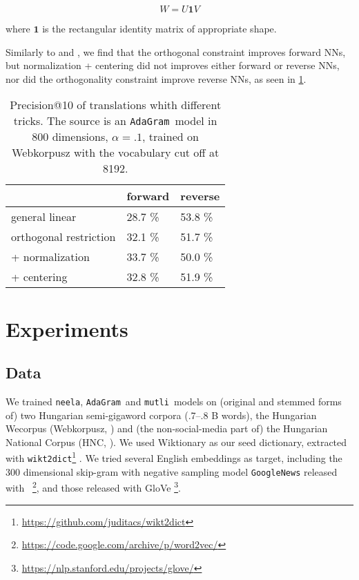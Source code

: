 \documentclass[11pt]{article}
\newcommand{\neelakantan}{\texttt{neela}}
\newcommand{\adagram}{\texttt{AdaGram}}
\newcommand{\mutli}{\texttt{mutli}}
\begin{document}
\[W=U\mathbf{1}V\]
 
\noindent where $\mathbf 1$ is the rectangular identity matrix of appropriate
shape.

Similarly to \cite{Xing:2015} and \cite{Artetxe:2016}, we find that the
orthogonal constraint improves forward NNs, but normalization + centering did
not improves either forward or reverse NNs, nor did the orthogonality
constraint improve reverse NNs, as seen in \cref{tab:orthog}.

\begin{table}
  \centering
  \begin{tabular}{lll}
    \toprule
                          & forward & reverse \\
    \midrule
    general linear        & 28.7 \% & 53.8 \% \\
    orthogonal restriction& 32.1 \% & 51.7 \% \\
    + normalization       & 33.7 \% & 50.0 \% \\
    + centering           & 32.8 \% & 51.9 \% \\
    \bottomrule
  \end{tabular}
  \caption{Precision@10 of translations whith different tricks. The source is
  an \adagram~model in 800 dimensions,
  $\alpha=.1$, trained on Webkorpusz with the vocabulary cut off at 8192.}
  \label{tab:orthog}
\end{table}


\section{Experiments}

\subsection{Data}

We trained \neelakantan, \adagram~and \mutli~models on (original and stemmed
forms of) two Hungarian semi-gigaword corpora (.7--.8 B words), the Hungarian
Wecorpus (Webkorpusz, \cite{Halacsy:2004}) and (the non-social-media part of)
the
Hungarian National Corpus (HNC, \cite{Oravecz:2014}).  We used Wiktionary as our
seed dictionary, extracted with
\texttt{wikt2dict}\footnote{\url{https://github.com/juditacs/wikt2dict}}
\citep{Acs:2013}. We tried several English embeddings as target, including the
300 dimensional skip-gram with negative sampling model
\texttt{GoogleNews} released with
\wordtovec~\citep{Mikolov:2013f}\footnote{\url{https://code.google.com/archive/p/word2vec/}},
and those released with GloVe
\citep{Pennington:2014}\footnote{\url{https://nlp.stanford.edu/projects/glove/}}.
\end{document}
